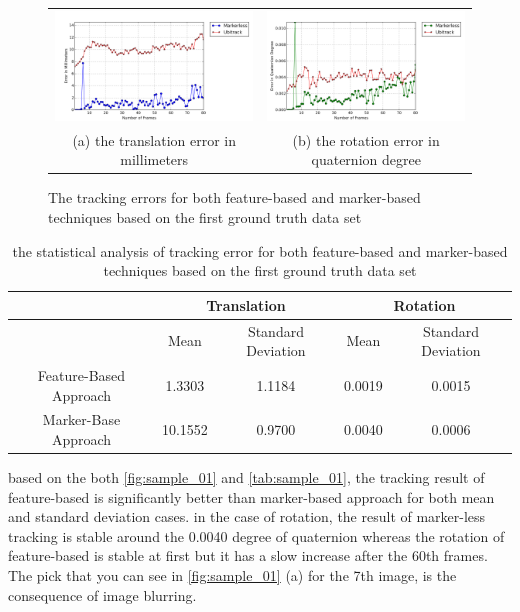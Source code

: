 \begin{figure}[H]
\begin{tabular}{cc}
  \includegraphics[width=80mm]{figures/global_35/graph_translation} &  \includegraphics[width=80mm]{figures/global_35/graph_rotation} \\
(a) the translation error in millimeters & (b) the rotation error in quaternion degree \\[6pt]
\end{tabular}
\caption{The tracking errors for both feature-based and marker-based techniques based on the first ground truth data set}   \label{fig:sample_01}
\end{figure}

\begin{table}[H]
\centering
  \begin{tabular}{| c || c | c | c | c |}
      \hline
      & \multicolumn{2}{c|}{Translation} & \multicolumn{2}{c|}{Rotation} \\ \hline
       & Mean & Standard Deviation & Mean & Standard Deviation \\ \hline
      Feature-Based Approach & 1.3303 & 1.1184 & 0.0019 & 0.0015 \\ \hline
      Marker-Base Approach & 10.1552 & 0.9700 & 0.0040 & 0.0006 \\ \hline
  \end{tabular}
  \caption{the statistical analysis of tracking error for both feature-based and marker-based techniques based on the first ground truth data set} \label{tab:sample_01}
\end{table}

based on the both \autoref{fig:sample_01} and \autoref{tab:sample_01}, the tracking result of feature-based is significantly better than marker-based approach for both mean and standard deviation cases. in the case of rotation, the result of marker-less tracking is stable around the 0.0040 degree of quaternion whereas the rotation of feature-based is stable at first but it has a slow increase after the 60th frames. The pick that you can see in \autoref{fig:sample_01} (a) for the 7th image, is the consequence of image blurring. 

